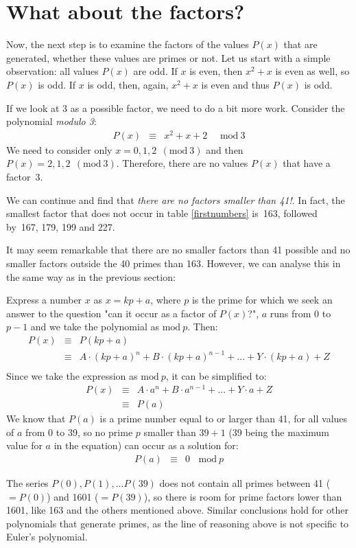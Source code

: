 \documentclass[onecolumn]{article}
\begin{document}
\section*{What about the factors?}
Now, the next step is to examine the factors of the values $P(x)$ that are generated, whether these values are primes or not. Let us start with a simple
observation: all values $P(x)$ are odd. If $x$ is even, then $x^2 + x$ is even as well, so $P(x)$ is odd. If $x$ is odd, then, again, $x^2 + x$ is even and
thus $P(x)$ is odd.

If we look at 3 as a possible factor, we need to do a bit more work. Consider the polynomial \emph{modulo 3}:
\begin{eqnarray}
     P(x) &\equiv& x^2 + x + 2 ~~~~~~\textrm{mod}~3
\end{eqnarray}
We need to consider only $x = 0, 1, 2 ~~(\textrm{mod}~3)$ and then $P(x) = 2, 1, 2 ~~(\textrm{mod}~3)$. Therefore, there are no values $P(x)$ that have a factor~3.

We can continue and find that \emph{there are no factors smaller than 41!}. In fact, the smallest factor that does not occur in table \ref{firstnumbers}
is~163, followed by~167, 179, 199 and 227.

It may seem remarkable that there are no smaller factors than 41 possible and no smaller factors outside the 40 primes than 163. However,
we can analyse this in the same way as in the previous section:

Express a number $x$ as $x = kp + a$, where $p$ is the prime for which we seek an answer to the question "can it occur as a factor of $P(x)$?",
$a$ runs from 0 to $p-1$ and we take the polynomial as $\textrm{mod}~p$. Then:
\begin{eqnarray}
\nonumber    P(x) &\equiv& P(k p + a) \\
                  &\equiv& A \cdot (k p + a)^n + B \cdot (k p + a)^{n-1} + ... + Y \cdot (k p + a) + Z \\
\end{eqnarray}
Since we take the expression as $\textrm{mod}~p$, it can be simplified to:
\begin{eqnarray}
\nonumber    P(x) &\equiv& A \cdot a^n + B \cdot a^{n-1} + ... + Y \cdot a + Z \\
                  &\equiv& P(a)
\end{eqnarray}
We know that $P(a)$ is a prime number equal to or larger than 41, for all values of $a$ from 0 to 39, so no prime $p$ smaller than $39+1$ (39 being the maximum value for $a$
in the equation) can occur as a solution for:
\begin{eqnarray}
            P(a) &\equiv& 0 ~~~~\textrm{mod}~p
\end{eqnarray}

The series $P(0), P(1), ... P(39)$ does not contain all primes between 41 ($= P(0)$) and 1601 ($= P(39)$), so there is room for prime factors
lower than 1601, like 163 and the others mentioned above. Similar conclusions hold for other polynomials that generate primes, as the line
of reasoning above is not specific to Euler's polynomial.
\end{document}
